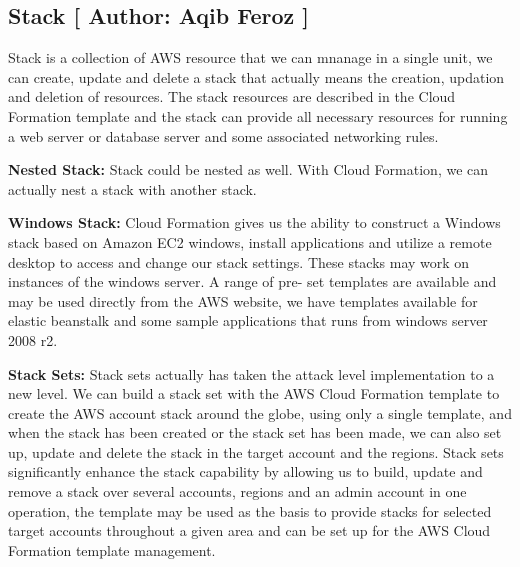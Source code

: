 \subsection{Stack [ Author: Aqib Feroz ]}
Stack is a collection of AWS resource that we can mnanage in a single unit, we can create, update and delete a stack that actually means the creation, updation and deletion of resources. The stack resources are described in the Cloud Formation template and the stack can provide all necessary resources for running a web server or database server and some associated networking rules.

\textbf{Nested Stack:}
Stack could be nested as well. With Cloud Formation, we can actually nest a stack with another stack. 

\textbf{Windows Stack:}
Cloud Formation gives us the ability to construct a Windows stack based on Amazon EC2 windows, install applications and utilize a remote desktop to access and change our stack settings. These stacks may work on instances of the windows server. A range of pre- set templates are available and may be used directly from the AWS website, we have templates available for elastic beanstalk and some sample applications that runs from windows server 2008 r2.

\textbf{Stack Sets:}
Stack sets actually has taken the attack level implementation to a new level. We can build a stack set with the AWS Cloud Formation template to create the AWS account stack around the globe, using only a single template, and when the stack has been created or the stack set has been made, we can also set up, update and delete the stack in the target account and the regions. Stack sets significantly enhance the stack capability by allowing us to build, update and remove a stack over several accounts, regions and an admin account in one operation, the template may be used as the basis to provide stacks for selected target accounts throughout a given area and can be set up for the AWS Cloud Formation template management.
